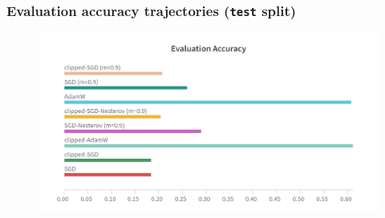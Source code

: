 \begin{frame}
    \frametitle{Evaluation accuracy trajectories (\texttt{test} split)}
    \begin{figure}[htpb]
        \begin{center}
            \includegraphics[width=\linewidth]
                {pics/experiments/eval_accuracy}
        \end{center}
    \end{figure}
\end{frame}
